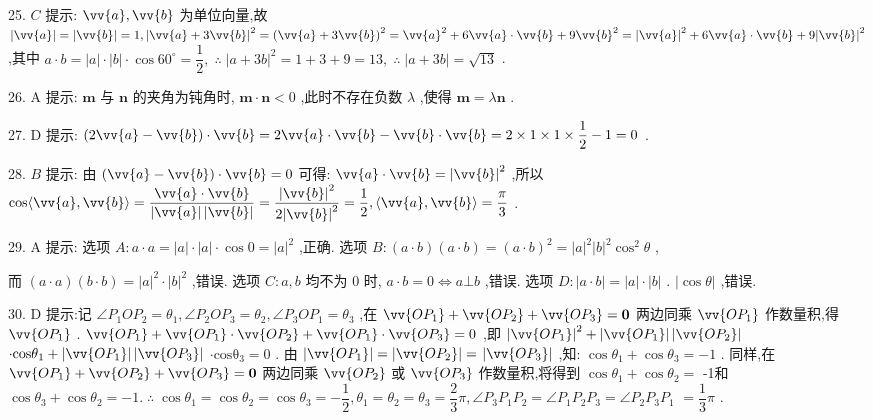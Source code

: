 25. $C$ 提示: $\vv{a},\vv{b}$ 为单位向量,故 $\left| \vv{a}\right|  = \left| \vv{b}\right|  = 1,{\left| \vv{a} + 3\vv{b}\right| }^{2} = {\left( \vv{a} + 3\vv{b}\right) }^{2} = {\vv{a}}^{2} + 6\vv{a} \cdot  \vv{b} + 9{\vv{b}}^{2} = {\left| \vv{a}\right| }^{2} + 6\vv{a} \cdot  \vv{b} + 9{\left| \vv{b}\right| }^{2}$ ,其中 $a \cdot  b = \left| a\right|  \cdot  \left| b\right|  \cdot  \cos {60}^{ \circ  } = \dfrac{1}{2},\;\therefore \;{\left| a + 3b\right| }^{2} = 1 + 3 + 9 = {13},\;\therefore \;\left| {a + {3b}}\right|  = \sqrt{13}$ .

26. A 提示: $\mathbf{m}$ 与 $\mathbf{n}$ 的夹角为钝角时, $\mathbf{m} \cdot  \mathbf{n} < 0$ ,此时不存在负数 $\lambda$ ,使得 $\mathbf{m} = \lambda \mathbf{n}$ .

27. D 提示: $\left( {2\vv{a} - \vv{b}}\right)  \cdot  \vv{b} = 2\vv{a} \cdot  \vv{b} - \vv{b} \cdot  \vv{b} = 2 \times  1 \times  1 \times  \dfrac{1}{2} - 1 = 0$ .

28. $B$ 提示: 由 $\left( {\vv{a} - \vv{b}}\right)  \cdot  \vv{b} = 0$ 可得: $\vv{a} \cdot  \vv{b} = {\left| \vv{b}\right| }^{2}$ ,所以 $\cos \langle \vv{a},\vv{b}\rangle  = \dfrac{\vv{a} \cdot  \vv{b}}{\left| \vv{a}\right| \left| \vv{b}\right| } = \dfrac{{\left| \vv{b}\right| }^{2}}{2{\left| \vv{b}\right| }^{2}} = \dfrac{1}{2},\langle \vv{a},\vv{b}\rangle  = \dfrac{\pi }{3}$ .

29. A 提示: 选项 $A : a \cdot  a = \left| a\right|  \cdot  \left| a\right|  \cdot  \cos 0 = {\left| a\right| }^{2}$ ,正确. 选项 $B : \left( {a \cdot  b}\right) \left( {a \cdot  b}\right)  = {\left( a \cdot  b\right) }^{2} = {\left| a\right| }^{2}{\left| b\right| }^{2}{\cos }^{2}\theta$ ,

而 $\left( {a \cdot  a}\right) \left( {b \cdot  b}\right)  = {\left| a\right| }^{2} \cdot  {\left| b\right| }^{2}$ ,错误. 选项 $C : a,b$ 均不为 0 时, $a \cdot  b = 0 \Leftrightarrow  a \bot  b$ ,错误. 选项 $D : \left| {a \cdot  b}\right|  = \left| a\right|  \cdot  \left| b\right|$ . $\left| {\cos \theta }\right|$ ,错误.

30. D 提示:记 $\angle {P}_{1}O{P}_{2} = {\theta }_{1},\angle {P}_{2}O{P}_{3} = {\theta }_{2},\angle {P}_{3}O{P}_{1} = {\theta }_{3}$ ,在 $\vv{O{P}_{1}} + \vv{O{P}_{2}} + \vv{O{P}_{3}} = \mathbf{0}$ 两边同乘 $\vv{O{P}_{1}}$ 作数量积,得 $\vv{O{P}_{1}}$ . $\vv{O{P}_{1}} + \vv{O{P}_{1}} \cdot  \vv{O{P}_{2}} + \vv{O{P}_{1}} \cdot  \vv{O{P}_{3}} = 0$ ,即 ${\left| \vv{O{P}_{1}}\right| }^{2} + \left| \vv{O{P}_{1}}\right| \left| \vv{O{P}_{2}}\right|$  $\cdot  {\mathrm{{cos\theta }}}_{1} + \left| \vv{O{P}_{1}}\right| \left| \vv{O{P}_{3}}\right|$  $\cdot  {\mathrm{{cos\theta }}}_{3} = 0$ . 由 $\left| \vv{O{P}_{1}}\right|  = \left| \vv{O{P}_{2}}\right|  =$  $\left| \vv{O{P}_{3}}\right|$ ,知: $\cos {\theta }_{1} + \cos {\theta }_{3} =  - 1$ . 同样,在 $\vv{O{P}_{1}} + \vv{O{P}_{2}} + \vv{O{P}_{3}} = \mathbf{0}$ 两边同乘 $\vv{O{P}_{2}}$ 或 $\vv{O{P}_{3}}$ 作数量积,将得到 $\cos {\theta }_{1} + \cos {\theta }_{2} =$ -1和 $\cos {\theta }_{3} + \cos {\theta }_{2} =  - 1.\;\therefore \;\cos {\theta }_{1} = \cos {\theta }_{2} = \cos {\theta }_{3} =  - \dfrac{1}{2},{\theta }_{1} = {\theta }_{2} = {\theta }_{3} = \dfrac{2}{3}\pi ,\angle {P}_{3}{P}_{1}{P}_{2} = \angle {P}_{1}{P}_{2}{P}_{3} = \angle {P}_{2}{P}_{3}{P}_{1}$  $= \dfrac{1}{3}\pi$ .

